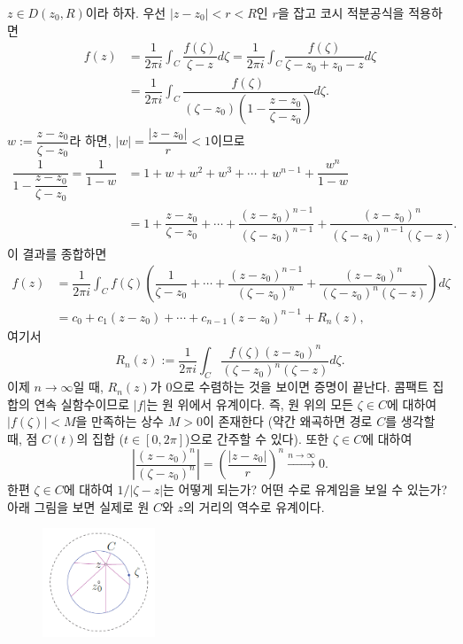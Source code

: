 $z\in D(z_0, R)$이라 하자.
우선 $|z-z_0|<r<R$인 $r$을 잡고
코시 적분공식을 적용하면
\begin{align*}
f(z) &= \dfrac1{2\pi i}\int_C \dfrac{f(\zeta)}{\zeta-z} d\zeta
= \dfrac1{2\pi i}\int_C \dfrac{f(\zeta)}{\zeta-z_0+z_0-z} d\zeta \\
&= \dfrac1{2\pi i}\int_C \dfrac{f(\zeta)}{(\zeta-z_0)\left(1- \dfrac{z-z_0}{\zeta-z_0}\right)} d\zeta.
\end{align*}
$w:=\dfrac{z-z_0}{\zeta-z_0}$라 하면,
$|w| = \dfrac{|z-z_0|}r <1$이므로
\begin{align*}
\dfrac1{1-\dfrac{z-z_0}{\zeta-z_0}} = \dfrac1{1-w}
& = 1+ w + w^2 + w^3 + \cdots + w^{n-1} + \dfrac{w^n}{1-w} \\
&= 1 + \dfrac{z-z_0}{\zeta-z_0} + \cdots + \dfrac{(z-z_0)^{n-1}}{(\zeta-z_0)^{n-1}}
+ \dfrac{(z-z_0)^n}{(\zeta-z_0)^{n-1}(\zeta-z)}.
\end{align*}
이 결과를 종합하면
\begin{align*}
f(z) &= \dfrac1{2\pi i}\int_C f(\zeta) \left(
\dfrac1{\zeta-z_0} + \cdots + \dfrac{(z-z_0)^{n-1}}{(\zeta-z_0)^{n}}
+ \dfrac{(z-z_0)^n}{(\zeta-z_0)^{n}(\zeta-z)} \right) d\zeta \\
&= c_0 + c_1(z-z_0) + \cdots + c_{n-1}(z-z_0)^{n-1} + R_n(z),
\end{align*}
여기서 
\[
R_n(z) := \dfrac1{2\pi i} \int_C \dfrac{f(\zeta)(z-z_0)^n}{(\zeta-z_0)^n(\zeta-z)}d\zeta.
\]
이제 $n\to\infty$일 때, $R_n(z)$가 $0$으로 수렴하는 것을 보이면 증명이 끝난다.
콤팩트 집합의 연속 실함수이므로 $|f|$는 원 위에서 유계이다.
즉, 원 위의 모든 $\zeta\in C$에 대하여 $|f(\zeta)|<M$을 만족하는 상수 $M>0$이 존재한다
(약간 왜곡하면 경로 $C$를 생각할 때, 점 $C(t)$의 집합 ($t\in [0,2\pi]$)으로 간주할 수 있다).
또한 $\zeta\in C$에 대하여
\[
\left| \dfrac{(z-z_0)^n}{(\zeta-z_0)^n}\right| 
= \left( \dfrac{|z-z_0|}r \right)^n
\stackrel{n\to\infty}{\longrightarrow} 0.
\]
한편 $\zeta\in C$에 대하여 $1/|\zeta-z|$는 어떻게 되는가?
어떤 수로 유계임을 보일 수 있는가?
아래 그림을 보면 실제로 원 $C$와  $z$의 거리의 역수로 유계이다.

\begin{figure}[h!]
\begin{center}
\includegraphics[width=0.3\textwidth]{./SaltChapter/fig-4-0-5}
\end{center}
\end{figure}

